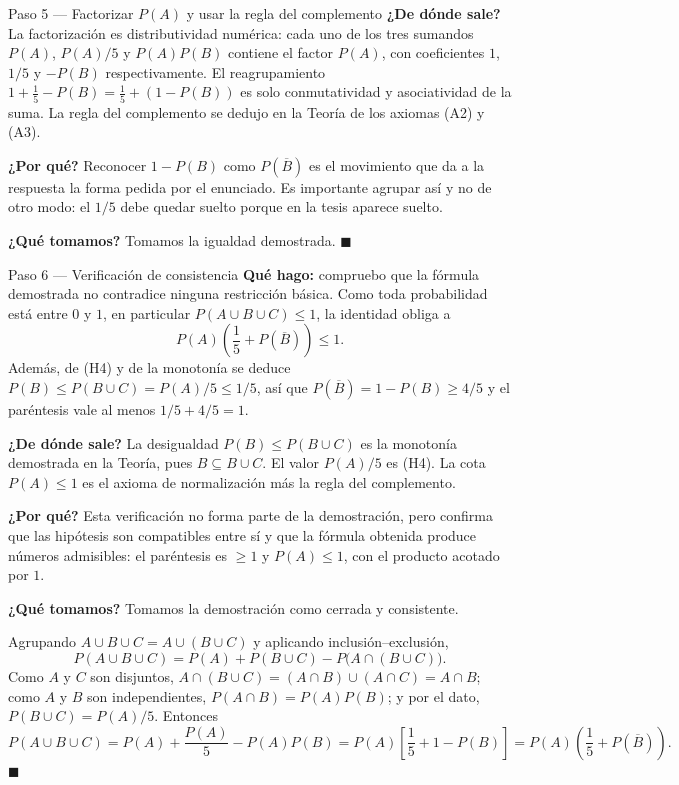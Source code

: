 \documentclass[11pt]{article}
\begin{document}
\begin{sol}
\begin{paso}{Paso 5 --- Factorizar $P(A)$ y usar la regla del complemento}
\textbf{¿De dónde sale?} La factorización es distributividad numérica: cada uno de los tres
sumandos $P(A)$, $P(A)/5$ y $P(A)P(B)$ contiene el factor $P(A)$, con coeficientes $1$, $1/5$
y $-P(B)$ respectivamente. El reagrupamiento $1+\frac15-P(B)=\frac15+(1-P(B))$ es solo
conmutatividad y asociatividad de la suma. La regla del complemento se dedujo en la Teoría de
los axiomas (A2) y (A3).

\textbf{¿Por qué?} Reconocer $1-P(B)$ como $P(\overline{B})$ es el movimiento que da a la
respuesta la forma pedida por el enunciado. Es importante agrupar así y no de otro modo: el
$1/5$ debe quedar suelto porque en la tesis aparece suelto.

\textbf{¿Qué tomamos?} Tomamos la igualdad demostrada. $\blacksquare$
\end{paso}

\begin{paso}{Paso 6 --- Verificación de consistencia}
\textbf{Qué hago:} compruebo que la fórmula demostrada no contradice ninguna restricción
básica. Como toda probabilidad está entre $0$ y $1$, en particular $P(A\cup B\cup C)\le 1$, la
identidad obliga a
\[
P(A)\left(\frac{1}{5}+P(\overline{B})\right)\le 1 .
\]
Además, de (H4) y de la monotonía se deduce $P(B)\le P(B\cup C)=P(A)/5\le 1/5$, así que
$P(\overline{B})=1-P(B)\ge 4/5$ y el paréntesis vale al menos $1/5+4/5=1$.

\textbf{¿De dónde sale?} La desigualdad $P(B)\le P(B\cup C)$ es la monotonía demostrada en la
Teoría, pues $B\subseteq B\cup C$. El valor $P(A)/5$ es (H4). La cota $P(A)\le 1$ es el
axioma de normalización más la regla del complemento.

\textbf{¿Por qué?} Esta verificación no forma parte de la demostración, pero confirma que las
hipótesis son compatibles entre sí y que la fórmula obtenida produce números admisibles: el
paréntesis es $\ge 1$ y $P(A)\le 1$, con el producto acotado por $1$.

\textbf{¿Qué tomamos?} Tomamos la demostración como cerrada y consistente.
\end{paso}
\end{sol}

\begin{resp}
Agrupando $A\cup B\cup C=A\cup(B\cup C)$ y aplicando inclusión--exclusión,
\[
P(A\cup B\cup C)=P(A)+P(B\cup C)-P\bigl(A\cap(B\cup C)\bigr).
\]
Como $A$ y $C$ son disjuntos, $A\cap(B\cup C)=(A\cap B)\cup(A\cap C)=A\cap B$; como $A$ y $B$
son independientes, $P(A\cap B)=P(A)P(B)$; y por el dato, $P(B\cup C)=P(A)/5$. Entonces
\[
P(A\cup B\cup C)=P(A)+\frac{P(A)}{5}-P(A)P(B)
=P(A)\left[\frac{1}{5}+1-P(B)\right]
=P(A)\left(\frac{1}{5}+P(\overline{B})\right).
\]
$\blacksquare$
\end{resp}
\end{document}
